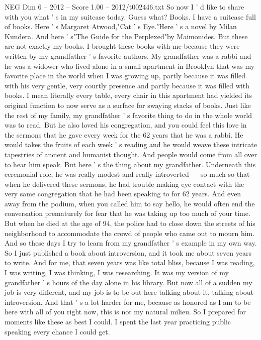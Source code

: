 \begin{textsample}{NEG Dim 6 – 2012 – Score 1.00 – 2012/t002446.txt}
So now I ' d like to share with you what ' s in my suitcase today.
Guess what?
Books.
I have a suitcase full of books.
Here ' s Margaret Atwood,"Cat ' s Eye."Here ' s a novel by Milan Kundera.
And here ' s"The Guide for the Perplexed"by Maimonides.
But these are not exactly my books.
I brought these books with me because they were written by my grandfather ' s favorite authors.
My grandfather was a rabbi and he was a widower who lived alone in a small apartment in Brooklyn that was my favorite place in the world when I was growing up, partly because it was filled with his very gentle, very courtly presence and partly because it was filled with books.
I mean literally every table, every chair in this apartment had yielded its original function to now serve as a surface for swaying stacks of books.
Just like the rest of my family, my grandfather ' s favorite thing to do in the whole world was to read.
But he also loved his congregation, and you could feel this love in the sermons that he gave every week for the 62 years that he was a rabbi.
He would takes the fruits of each week ' s reading and he would weave these intricate tapestries of ancient and humanist thought.
And people would come from all over to hear him speak.
But here ' s the thing about my grandfather.
Underneath this ceremonial role, he was really modest and really introverted — so much so that when he delivered these sermons, he had trouble making eye contact with the very same congregation that he had been speaking to for 62 years.
And even away from the podium, when you called him to say hello, he would often end the conversation prematurely for fear that he was taking up too much of your time.
But when he died at the age of 94, the police had to close down the streets of his neighborhood to accommodate the crowd of people who came out to mourn him.
And so these days I try to learn from my grandfather ' s example in my own way.
So I just published a book about introversion, and it took me about seven years to write.
And for me, that seven years was like total bliss, because I was reading, I was writing, I was thinking, I was researching.
It was my version of my grandfather ' s hours of the day alone in his library.
But now all of a sudden my job is very different, and my job is to be out here talking about it, talking about introversion.
And that ' s a lot harder for me, because as honored as I am to be here with all of you right now, this is not my natural milieu.
So I prepared for moments like these as best I could.
I spent the last year practicing public speaking every chance I could get.

\end{textsample}
